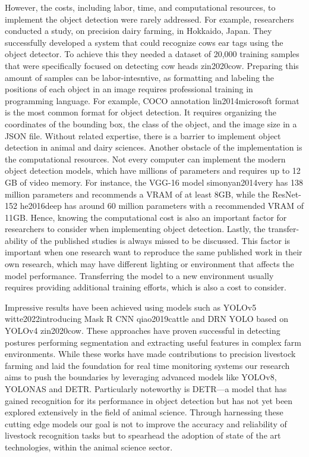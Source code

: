 However, the costs, including labor, time, and computational resources, to implement the object detection were rarely addressed. For example, researchers conducted a study, on precision dairy farming, in Hokkaido, Japan. They successfully developed a system that could recognize cows ear tags using the object detector. To achieve this they needed a dataset of 20,000 training samples that were specifically focused on detecting cow heads {zin2020cow}. Preparing this amount of samples can be labor-intesntive, as formatting and labeling the positions of each object in an image requires professional training in programming language. For example, COCO annotation {lin2014microsoft} format is the most common format for object detection. It requires organizing the coordinates of the bounding box, the class of the object, and the image size in a JSON file. Without related expertise, there is a barrier to implement object detection in animal and dairy sciences. Another obstacle of the implementation is the computational resources. Not every computer can implement the modern object detection models, which have millions of parameters and requires up to 12 GB of video memory. For instance, the VGG-16 model {simonyan2014very} has 138 million parameters and recommends a VRAM of at least 8GB, while the ResNet-152 {he2016deep} has around 60 million parameters with a recommended VRAM of 11GB. Hence, knowing the computational cost is also an important factor for researchers to consider when implementing object detection. Lastly, the transfer-ability of the published studies is always missed to be discussed. This factor is important when one research want to reproduce the same published work in their own research, which may have different lighting or environment that affects the model performance. Transferring the model to a new environment usually requires providing additional training efforts, which is also a cost to consider.

Impressive results have been achieved using models such as YOLOv5 {witte2022introducing} Mask R CNN {qiao2019cattle} and DRN YOLO based on YOLOv4 {zin2020cow}. These approaches have proven successful in detecting postures performing segmentation and extracting useful features in complex farm environments. While these works have made contributions to precision livestock farming and laid the foundation for real time monitoring systems our research aims to push the boundaries by leveraging advanced models like YOLOv8, YOLONAS and DETR. Particularly noteworthy is DETR—a model that has gained recognition for its performance in object detection but has not yet been explored extensively in the field of animal science. Through harnessing these cutting edge models our goal is not to improve the accuracy and reliability of livestock recognition tasks but to spearhead the adoption of state of the art technologies, within the animal science sector.




